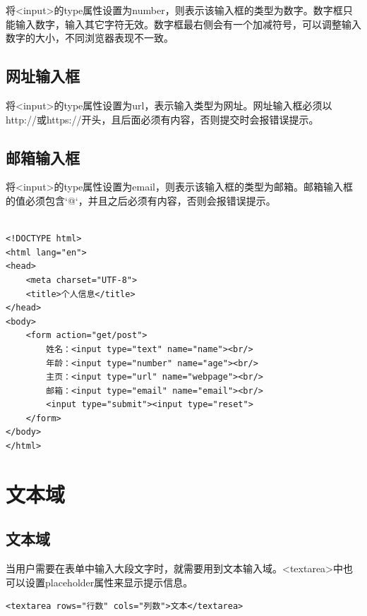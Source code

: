 将<input>的type属性设置为number，则表示该输入框的类型为数字。数字框只能输入数字，输入其它字符无效。数字框最右侧会有一个加减符号，可以调整输入数字的大小，不同浏览器表现不一致。

\subsection{网址输入框}

将<input>的type属性设置为url，表示输入类型为网址。网址输入框必须以http://或https://开头，且后面必须有内容，否则提交时会报错误提示。

\subsection{邮箱输入框}

将<input>的type属性设置为email，则表示该输入框的类型为邮箱。邮箱输入框的值必须包含`@`，并且之后必须有内容，否则会报错误提示。 \\

 \\
\begin{lstlisting}[style=htmlcssjs]
<!DOCTYPE html>
<html lang="en">
<head>
    <meta charset="UTF-8">
    <title>个人信息</title>
</head>
<body>
    <form action="get/post">
        姓名：<input type="text" name="name"><br/>
        年龄：<input type="number" name="age"><br/>
        主页：<input type="url" name="webpage"><br/>
        邮箱：<input type="email" name="email"><br/>
        <input type="submit"><input type="reset">
    </form>
</body>
</html>
\end{lstlisting}

\newpage

\section{文本域}

\subsection{文本域}

当用户需要在表单中输入大段文字时，就需要用到文本输入域。<textarea>中也可以设置placeholder属性来显示提示信息。 \\

\begin{lstlisting}[style=htmlcssjs]
<textarea rows="行数" cols="列数">文本</textarea>
\end{lstlisting}

